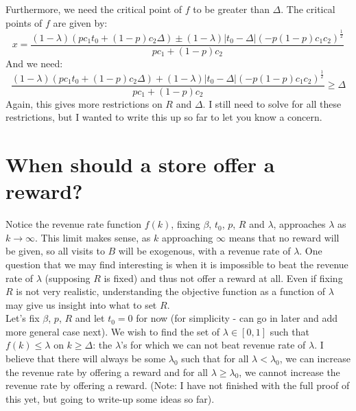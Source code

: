 \documentclass{article}
\begin{document}
Furthermore, we need the critical point of $f$ to be greater than $\Delta$. The critical points of $f$ are given by:
\begin{equation*}
x = \frac{(1-\lambda)(pc_1t_0+(1-p)c_2\Delta) \pm (1-\lambda)|t_0-\Delta|(-p(1-p)c_1c_2)^{\frac{1}{2}}}{pc_1+(1-p)c_2}
\end{equation*}
And we need:
\begin{equation*}
\frac{(1-\lambda)(pc_1t_0+(1-p)c_2\Delta) + (1-\lambda)|t_0-\Delta|(-p(1-p)c_1c_2)^{\frac{1}{2}}}{pc_1+(1-p)c_2} \geq \Delta
\end{equation*}
Again, this gives more restrictions on $R$ and $\Delta$. I still need to solve for all these restrictions, but I wanted to write this up so far to let you know a concern.

\section{When should a store offer a reward?}

Notice the revenue rate function $f(k)$, fixing $\beta$, $t_0$, $p$, $R$ and $\lambda$, approaches $\lambda$ as $k \rightarrow \infty$. This limit makes sense, as $k$ approaching $\infty$ means that no reward will be given, so all visits to $B$ will be exogenous, with a revenue rate of $\lambda$. One question that we may find interesting is when it is impossible to beat the revenue rate of $\lambda$ (supposing $R$ is fixed) and thus not offer a reward at all. Even if fixing $R$ is not very realistic, understanding the objective function as a function of $\lambda$ may give us insight into what to set $R$. \\

Let's fix $\beta$, $p$, $R$ and let $t_0 = 0$ for now (for simplicity - can go in later and add more general case next). We wish to find the set of $\lambda \in [0,1]$ such that $f(k) \leq \lambda$ on $k \geq \Delta$: the $\lambda$'s for which we can not beat revenue rate of $\lambda$. I believe that there will always be some $\lambda_0$ such that for all $\lambda < \lambda_0$, we can increase the revenue rate by offering a reward and for all $\lambda \geq \lambda_0$, we cannot increase the revenue rate by offering a reward. (Note: I have not finished with the full proof of this yet, but going to write-up some ideas so far). \\
\end{document}
